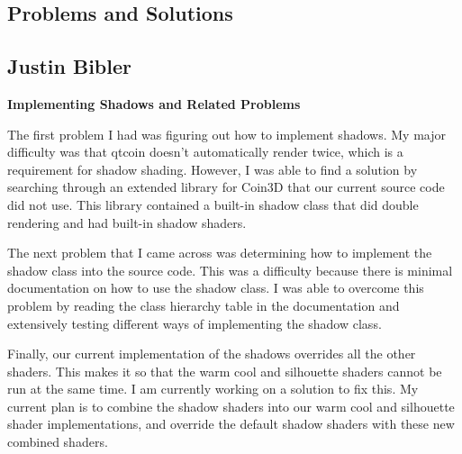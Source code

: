 \documentclass[10pt,journal,compsoc,draftclsnofoot]{IEEEtran}
\begin{document}
\begin{flushleft}
\newpage

\section{Problems and Solutions}
\subsection{Justin Bibler}
\textbf{Implementing Shadows and Related Problems}
\par
The first problem I had was figuring out how to implement shadows.
My major difficulty was that qtcoin doesn't automatically render twice, which is a requirement for shadow shading.
However, I was able to find a solution by searching through an extended library for Coin3D that our current source code did not use.
This library contained a built-in shadow class that did double rendering and had built-in shadow shaders.

\vspace{3mm}

The next problem that I came across was determining how to implement the shadow class into the source code.
This was a difficulty because there is minimal documentation on how to use the shadow class.
I was able to overcome this problem by reading the class hierarchy table in the documentation and extensively testing different ways of implementing the shadow class.

\vspace{3mm}

Finally, our current implementation of the shadows overrides all the other shaders.
This makes it so that the warm cool and silhouette shaders cannot be run at the same time.
I am currently working on a solution to fix this.
My current plan is to combine the shadow shaders into our warm cool and silhouette shader implementations, and override the default shadow shaders with these new combined shaders.

\newpage


\end{flushleft}
\end{document}

